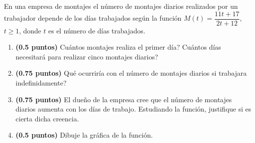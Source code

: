 
En una empresa de montajes el número de montajes diarios realizados por un trabajador depende de los días trabajados según la función $M(t)=\dfrac{11t+17}{2t+12}$, $t\geq1$, donde $t$ es el número de días trabajados.
\begin{enumerate}[label=\alph*)]
\item \textbf{(0.5 puntos)} \textquestiondown{}Cuántos montajes realiza el primer día? \textquestiondown{}Cuántos días necesitará para realizar cinco montajes diarios?
\item \textbf{(0.75 puntos)} \textquestiondown{}Qué ocurriría con el número de montajes diarios si trabajara indefinidamente?
\item \textbf{(0.75 puntos)} El dueño de la empresa cree que el número de montajes diarios aumenta con los días de trabajo. Estudiando la función, justifique si es cierta dicha creencia.
\item \textbf{(0.5 puntos)} Dibuje la gráfica de la función.
\end{enumerate}
